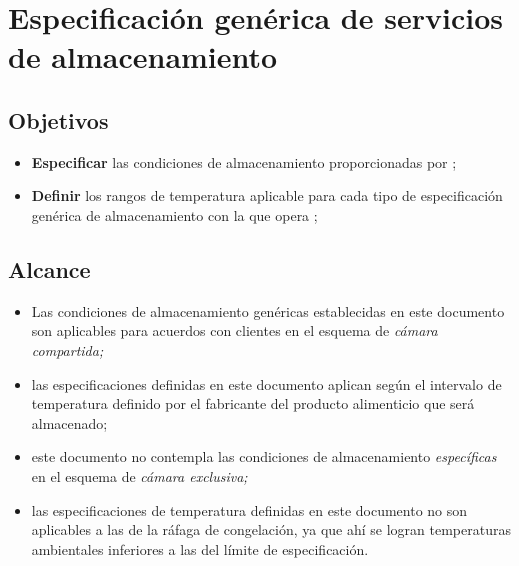 \renewcommand{\MayorVer}{2}
\renewcommand{\MenorVer}{1}
\renewcommand{\Codigo}{PSA-9-ESP} %
\renewcommand{\FechaPub}{2023--01}
\renewcommand{\Titulo}{Especificación genérica de servicios de almacenamiento}

\section{\Titulo}
\label{esp:generica}

\subsection{Objetivos}

\begin{itemize}
	\item \textbf{Especificar} las condiciones de almacenamiento proporcionadas por ;
	\item \textbf{Definir} los rangos de temperatura aplicable para cada tipo de especificación genérica de almacenamiento con la que opera ;
\end{itemize}

\subsection{Alcance}

\begin{itemize}
	\item Las condiciones de almacenamiento genéricas establecidas en este documento son aplicables para acuerdos con clientes en el esquema de \emph{cámara compartida;}
	\item las especificaciones definidas en este documento aplican según el intervalo de temperatura definido por el fabricante del producto alimenticio que será almacenado;
	\item este documento no contempla las condiciones de almacenamiento \emph{específicas} en el esquema de \emph{cámara exclusiva;}
	\item las especificaciones de temperatura definidas en este documento no son aplicables a las de la ráfaga de congelación, ya que ahí se logran temperaturas ambientales inferiores a las del límite de especificación.
\end{itemize}

